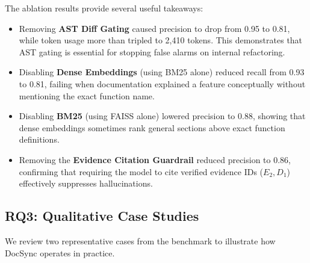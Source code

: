 \documentclass[12pt,onecolumn,draftclsnofoot]{IEEEtran}
\begin{document}
\begin{table}[t]
\centering
\caption{Ablation Analysis of DocSync Pipeline Components}
\label{tab:ablation}
\end{table}

The ablation results provide several useful takeaways:
\begin{itemize}
    \item Removing \textbf{AST Diff Gating} caused precision to drop from 0.95 to 0.81, while token usage more than tripled to 2,410 tokens. This demonstrates that AST gating is essential for stopping false alarms on internal refactoring.
    \item Disabling \textbf{Dense Embeddings} (using BM25 alone) reduced recall from 0.93 to 0.81, failing when documentation explained a feature conceptually without mentioning the exact function name.
    \item Disabling \textbf{BM25} (using FAISS alone) lowered precision to 0.88, showing that dense embeddings sometimes rank general sections above exact function definitions.
    \item Removing the \textbf{Evidence Citation Guardrail} reduced precision to 0.86, confirming that requiring the model to cite verified evidence IDs ($E_2, D_1$) effectively suppresses hallucinations.
\end{itemize}

\subsection{RQ3: Qualitative Case Studies}
We review two representative cases from the benchmark to illustrate how DocSync operates in practice.
\end{document}
